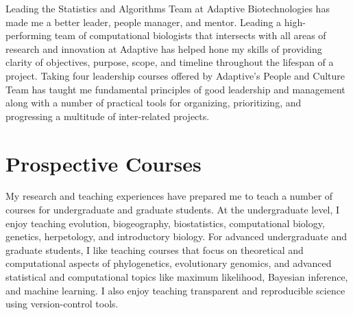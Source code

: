 Leading the Statistics and Algorithms Team at Adaptive Biotechnologies has made
me a better leader, people manager, and mentor.
Leading a high-performing team of computational biologists that intersects with
all areas of research and innovation at Adaptive has helped hone my skills of
providing clarity of objectives, purpose, scope, and timeline throughout the
lifespan of a project.
Taking four leadership courses offered by Adaptive's People and Culture Team
has taught me fundamental principles of good leadership and management along
with a number of practical tools for organizing, prioritizing, and progressing
a multitude of inter-related projects.


\section*{Prospective Courses}


My research and teaching experiences have prepared me to teach a number of
courses for undergraduate and graduate students.
At the undergraduate level, I enjoy teaching
evolution,
biogeography,
biostatistics,
computational biology,
genetics,
herpetology,
and
introductory biology.
For advanced undergraduate and graduate students, I like teaching courses
that focus on theoretical and computational aspects of
phylogenetics,
evolutionary genomics,
and
advanced statistical and computational topics like
maximum likelihood,
Bayesian inference,
and
machine learning.
I also enjoy teaching transparent and reproducible science using version-control tools.

